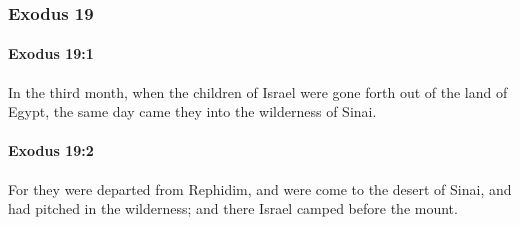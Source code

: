 	\subsubsection{Exodus 19} %
		\label{EXODUS-19}

		\paragraph{Exodus 19:1} %
			\label{EXODUS-19-1}

			In the third month, when the children of Israel were gone forth out of the land of Egypt, the same day came they into the wilderness of Sinai.


		\paragraph{Exodus 19:2} %
			\label{EXODUS-19-2}

			For they were departed from Rephidim, and were come to the desert of Sinai, and had pitched in the wilderness; and there Israel camped before the mount.

